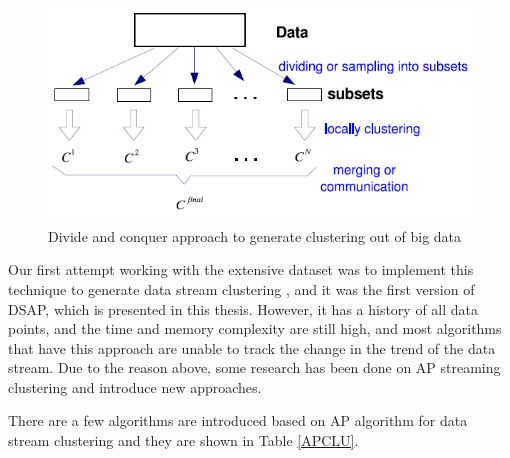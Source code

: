 \documentclass[../UNBThesis2.tex]{subfiles}
\begin{document}
\begin{figure}[!h]
    \centering
    \includegraphics[width = 11 cm]{image/Chapters/Chapter3/divide.PNG}
    \caption{Divide and conquer approach to generate clustering out of big data \protect\cite{zhang2009toward}}
    \label{dividee}
\end{figure}


Our first attempt working with the extensive dataset was to implement this technique to generate data stream clustering \cite{ivarispatio}, and it was the first version of DSAP, which is presented in this thesis. However, it has a history of all data points, and the time and memory complexity are still high, and most algorithms that have this approach are unable to track the change in the trend of the data stream. 
Due to the reason above, some research has been done on AP streaming clustering and introduce new approaches.



There are a few algorithms are introduced based on AP algorithm for data stream clustering and they are shown in Table \ref{APCLU}. 
\end{document}
